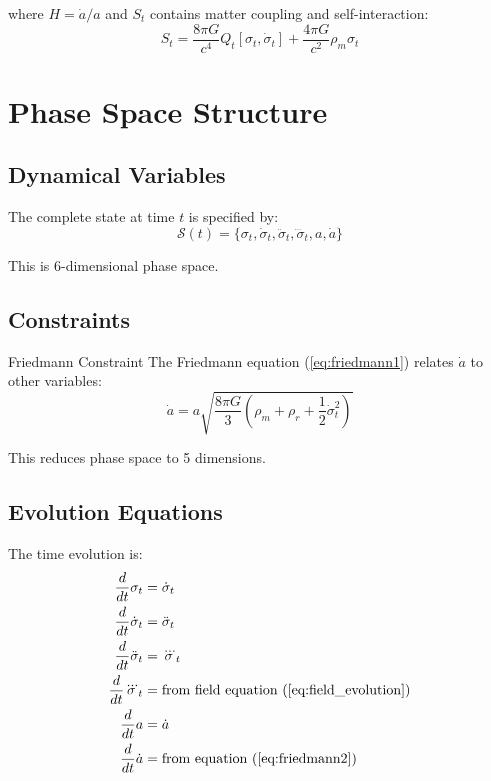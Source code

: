 \documentclass[11pt,a4paper]{article}
\theoremstyle{definition}
\theoremstyle{remark}
\begin{document}
	where $H = \dot{a}/a$ and $S_t$ contains matter coupling and self-interaction:
	\begin{equation}
		S_t = \frac{8\pi G}{c^4}Q_t[\sigma_t, \dot{\sigma}_t] + \frac{4\pi G}{c^2}\rho_m\sigma_t
	\end{equation}
	
	\section{Phase Space Structure}
	
	\subsection{Dynamical Variables}
	
	The complete state at time $t$ is specified by:
	\begin{equation}
		\mathcal{S}(t) = \{\sigma_t, \dot{\sigma}_t, \ddot{\sigma}_t, \dddot{\sigma}_t, a, \dot{a}\}
	\end{equation}
	
	This is 6-dimensional phase space.
	
	\subsection{Constraints}
	
	Friedmann Constraint
		The Friedmann equation (\ref{eq:friedmann1}) relates $\dot{a}$ to other variables:
		\begin{equation}
			\dot{a} = a\sqrt{\frac{8\pi G}{3}\left(\rho_m + \rho_r + \frac{1}{2}\dot{\sigma}_t^2\right)}
		\end{equation}
		
		This reduces phase space to 5 dimensions.
	
	\subsection{Evolution Equations}
	
	The time evolution is:
	\begin{align}
		\frac{d}{dt}\sigma_t &= \dot{\sigma}_t\\
		\frac{d}{dt}\dot{\sigma}_t &= \ddot{\sigma}_t\\
		\frac{d}{dt}\ddot{\sigma}_t &= \dddot{\sigma}_t\\
		\frac{d}{dt}\dddot{\sigma}_t &= \text{from field equation (\ref{eq:field_evolution})}\\
		\frac{d}{dt}a &= \dot{a}\\
		\frac{d}{dt}\dot{a} &= \text{from equation (\ref{eq:friedmann2})}
	\end{align}
	
\end{document}

